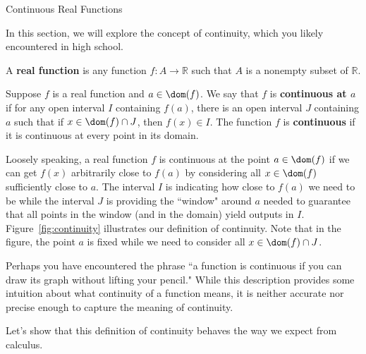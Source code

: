 \begin{section}{Continuous Real Functions}\label{sec:Continuity}

In this section, we will explore the concept of continuity, which you likely encountered in high school.

\begin{definition}
A \textbf{real function} is any function $f:A\to \mathbb{R}$ such that $A$ is a nonempty subset of $\mathbb{R}$. 
\end{definition}

\begin{definition}\label{def:continuity}
Suppose $f$ is a real function and $a\in \dom(f)$. We say that $f$ is \textbf{continuous at $a$} if for any open interval $I$ containing $f(a)$, there is an open interval $J$ containing $a$ such that if $x\in \dom(f)\cap J$, then $f(x)\in I$. The function $f$ is \textbf{continuous} if it is continuous at every point in its domain.
\end{definition}

Loosely speaking, a real function $f$ is continuous at the point $a\in\dom(f)$ if we can get $f(x)$ arbitrarily close to $f(a)$ by considering all $x\in\dom(f)$ sufficiently close to $a$.  The interval $I$ is indicating how close to $f(a)$ we need to be while the interval $J$ is providing the ``window" around $a$ needed to guarantee that all points in the window (and in the domain) yield outputs in $I$. Figure~\ref{fig:continuity} illustrates our definition of continuity. Note that in the figure, the point $a$ is fixed while we need to consider all $x\in\dom(f)\cap J$.

Perhaps you have encountered the phrase ``a function is continuous if you can draw its graph without lifting your pencil." While this description provides some intuition about what continuity of a function means, it is neither accurate nor precise enough to capture the meaning of continuity.

Let's show that this definition of continuity behaves the way we expect from calculus.

\begin{figure}[h!]
\centering
{}
\end{figure}
\end{section}
